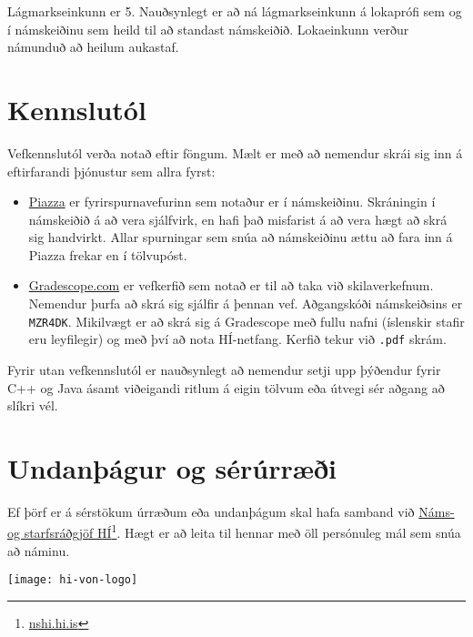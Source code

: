\documentclass{article}
\begin{document}
Lágmarkseinkunn er 5. Nauðsynlegt er að ná lágmarkseinkunn á lokaprófi sem og í námskeiðinu sem heild til að standast námskeiðið. Lokaeinkunn verður námunduð að heilum aukastaf.

\section{Kennslutól}
\label{sec:tools}
Vefkennslutól verða notað eftir föngum. Mælt er með að nemendur skrái sig inn á eftirfarandi þjónustur sem allra fyrst:
\begin{itemize}
	\item \href{https://piazza.com/hi.is/spring2018/tl203g}{Piazza} er fyrirspurnavefurinn sem notaður er í námskeiðinu. Skráningin í námskeiðið á að vera sjálfvirk, en hafi það misfarist á að vera hægt að skrá sig handvirkt. Allar spurningar sem snúa að námskeiðinu ættu að fara inn á Piazza frekar en í tölvupóst.
	\item \href{https://gradescope.com/courses/14122}{Gradescope.com} er vefkerfið sem notað er til að taka við skilaverkefnum. Nemendur þurfa að skrá sig sjálfir á þennan vef. Aðgangskóði námskeiðsins er \texttt{MZR4DK}. Mikilvægt er að skrá sig á Gradescope með fullu nafni (íslenskir stafir eru leyfilegir) og með því að nota HÍ-netfang. Kerfið tekur við \texttt{.pdf} skrám.
\end{itemize}
Fyrir utan vefkennslutól er nauðsynlegt að nemendur setji upp þýðendur fyrir C++ og Java ásamt viðeigandi ritlum á eigin tölvum eða útvegi sér aðgang að slíkri vél.

\section{Undanþágur og sérúrræði}

Ef þörf er á sérstökum úrræðum eða undanþágum skal hafa samband við \href{http://nshi.hi.is/}{Náms- og starfsráðgjöf HÍ}\footnote{\url{nshi.hi.is}}. Hægt er að leita til hennar með öll persónuleg mál sem snúa að náminu.

\vfill
\texttt{[image: hi-von-logo]}
\end{document}
